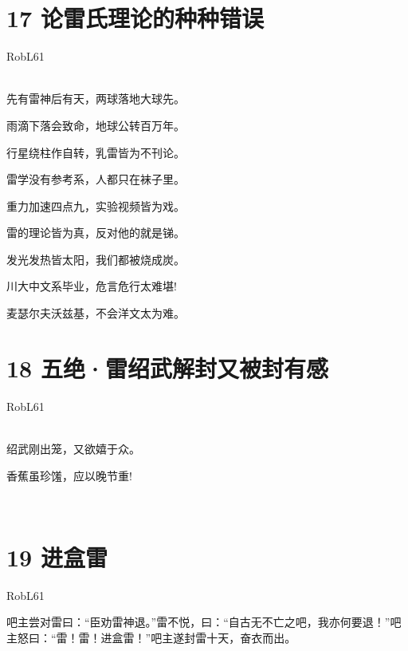\documentclass[UTF8,12pt,oneside]{ctexbook}
\begin{document}
    \section{17 论雷氏理论的种种错误}
    \begin{center}
        RobL61
        
        ~\\
        先有雷神后有天，两球落地大球先。
        
        雨滴下落会致命，地球公转百万年。
        
        行星绕柱作自转，乳雷皆为不刊论。
        
        雷学没有参考系，人都只在袜子里。
        
        重力加速四点九，实验视频皆为戏。
        
        雷的理论皆为真，反对他的就是锑。
        
        发光发热皆太阳，我们都被烧成炭。
        
        川大中文系毕业，危言危行太难堪!
        
        麦瑟尔夫沃兹基，不会洋文太为难。
        
    \end{center}
    
    \section{18 五绝·雷绍武解封又被封有感}
    \begin{center}
        RobL61
        
        ~\\
        绍武刚出笼，又欲嬉于众。
        
        香蕉虽珍馐，应以晚节重!
        
        ~\\
        
    \end{center}
    
    \section{19 进盒雷}
    \begin{center}
        \large
        \songti
        \normalsize
        
        RobL61
        
    \end{center}
    
        吧主尝对雷曰：“臣劝雷神退。”雷不悦，曰：“自古无不亡之吧，我亦何要退！”吧主怒曰：“雷！雷！进盒雷！”吧主遂封雷十天，奋衣而出。
        ~\\
        
\end{document}
